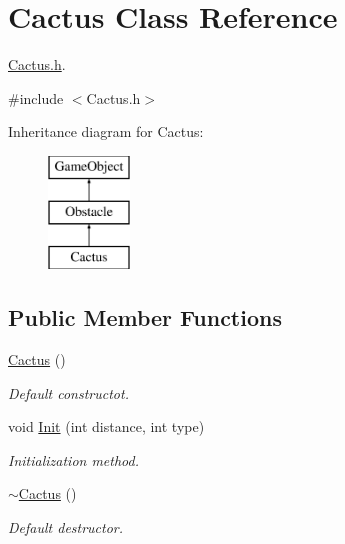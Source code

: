 \hypertarget{class_cactus}{}\section{Cactus Class Reference}
\label{class_cactus}


\mbox{\hyperlink{_cactus_8h_source}{Cactus.\+h}}.  




{\ttfamily \#include $<$Cactus.\+h$>$}

Inheritance diagram for Cactus\+:\begin{figure}[H]
\begin{center}
\leavevmode
\includegraphics[height=3.000000cm]{class_cactus}
\end{center}
\end{figure}
\subsection*{Public Member Functions}
\begin{DoxyCompactItemize}
\item 
\mbox{\hyperlink{class_cactus_a7af2b09f8e3efd82ee3d5dc1b5ad24d7}{Cactus}} ()
\begin{DoxyCompactList}\small\item\em Default constructot. \end{DoxyCompactList}\item 
void \mbox{\hyperlink{class_cactus_a44cd240a41740db3216ce9d18ea9a8aa}{Init}} (int distance, int type)
\begin{DoxyCompactList}\small\item\em Initialization method. \end{DoxyCompactList}\item 
\mbox{\label{class_cactus_aad137061a9d2432ac47f4c28b23644c3}} 
\mbox{\hyperlink{class_cactus_aad137061a9d2432ac47f4c28b23644c3}{$\sim$\+Cactus}} ()
\begin{DoxyCompactList}\small\item\em Default destructor. \end{DoxyCompactList}\end{DoxyCompactItemize}
